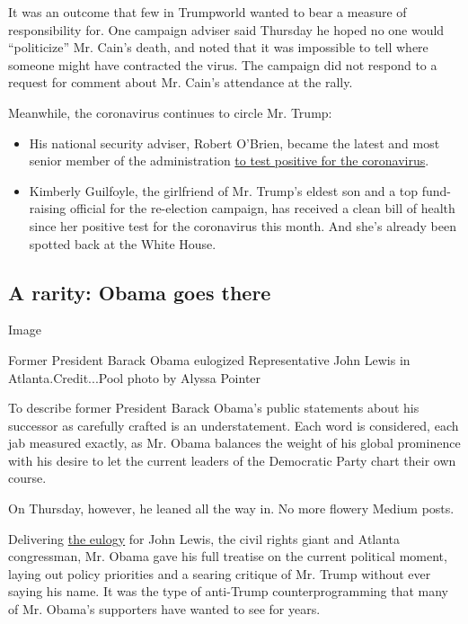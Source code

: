 It was an outcome that few in Trumpworld wanted to bear a measure of
responsibility for. One campaign adviser said Thursday he hoped no one
would ``politicize'' Mr. Cain's death, and noted that it was impossible
to tell where someone might have contracted the virus. The campaign did
not respond to a request for comment about Mr. Cain's attendance at the
rally.

Meanwhile, the coronavirus continues to circle Mr. Trump:

\begin{itemize}
\item
  His national security adviser, Robert O'Brien, became the latest and
  most senior member of the administration
  \href{https://www.nytimes3xbfgragh.onion/2020/07/27/us/politics/robert-obrien-virus.html}{to
  test positive for the coronavirus}.
\item
  Kimberly Guilfoyle, the girlfriend of Mr. Trump's eldest son and a top
  fund-raising official for the re-election campaign, has received a
  clean bill of health since her positive test for the coronavirus this
  month. And she's already been spotted back at the White House.
\end{itemize}

\hypertarget{a-rarity-obama-goes-there}{%
\subsection{A rarity: Obama goes
there}\label{a-rarity-obama-goes-there}}

Image

Former President Barack Obama eulogized Representative John Lewis in
Atlanta.Credit...Pool photo by Alyssa Pointer

To describe former President Barack Obama's public statements about his
successor as carefully crafted is an understatement. Each word is
considered, each jab measured exactly, as Mr. Obama balances the weight
of his global prominence with his desire to let the current leaders of
the Democratic Party chart their own course.

On Thursday, however, he leaned all the way in. No more flowery Medium
posts.

Delivering
\href{https://www.nytimes3xbfgragh.onion/2020/07/30/us/obama-eulogy-john-lewis-full-transcript.html}{the
eulogy} for John Lewis, the civil rights giant and Atlanta congressman,
Mr. Obama gave his full treatise on the current political moment, laying
out policy priorities and a searing critique of Mr. Trump without ever
saying his name. It was the type of anti-Trump counterprogramming that
many of Mr. Obama's supporters have wanted to see for years.

